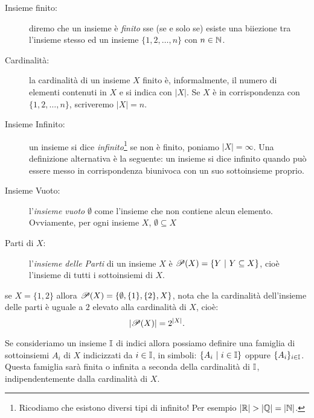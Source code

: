 		\begin{description}
			\item[Insieme finito:] diremo che un insieme è \emph{finito} sse (se e solo se) esiste una biiezione tra l'insieme stesso ed un insieme $\{1,2,\ldots,n\}$ con $n\in\mathbb{N}$.
			\item[Cardinalità:] la cardinalità di un insieme $X$ finito è, informalmente, il numero di elementi contenuti in $X$ e si indica con $|X|$. Se $X$ è in corrispondenza con $\{1,2,\ldots,n\}$, scriveremo $|X|=n$.
			\item[Insieme Infinito:] un insieme si dice \emph{infinito}\footnote{Ricodiamo che esistono diversi tipi di infinito! Per esempio $|\R|>|\Q|=|\N|$.} se non è finito, poniamo $|X|=\infty$. Una definizione alternativa è la seguente: un insieme si dice infinito quando può essere messo in corrispondenza biunivoca con un suo sottoinsieme proprio.
			\item[Insieme Vuoto:] l'\emph{insieme vuoto} $\emptyset$ come l'insieme che non contiene alcun elemento. Ovviamente, per ogni insieme $X$, $\emptyset\subseteq X$
			\item[Parti di $X$:] l'\emph{insieme delle Parti} di un insieme $X$ è $\mathscr{P}(X)=\{Y\ \rvert\  Y\subseteq X\}$, cioè l'insieme di tutti i sottoinsiemi di $X$.
		\end{description}
		\begin{eg}
			se $X=\{1,2\}$ allora $\mathscr{P}(X)=\{ \emptyset, \{1\}, \{2\}, X \}$, nota che la cardinalità dell'insieme delle parti è uguale a $2$ elevato alla cardinalità di $X$, cioè: 
			\begin{equation*} 
				|\mathscr{P}(X)|=2^{|X|}.
			\end{equation*}
		\end{eg}
	
		Se consideriamo un insieme $\mathbb{I}$ di indici allora possiamo definire una famiglia di sottoinsiemi $A_i$ di $X$ indicizzati da $i\in\mathbb{I}$, in simboli: $\{A_i\ \rvert\  i\in\mathbb{I}\}$ oppure $\{A_i\}_{i\in\mathbb{I}}$. Questa famiglia sarà finita o infinita a seconda della cardinalità di $\mathbb{I}$, indipendentemente dalla cardinalità di $X$.
		
